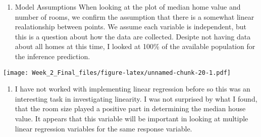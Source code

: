 \documentclass[]{article}
\newenvironment{Shaded}{\begin{snugshade}}{\end{snugshade}}
\newcommand{\KeywordTok}[1]{\textcolor[rgb]{0.13,0.29,0.53}{\textbf{#1}}}
\newcommand{\DataTypeTok}[1]{\textcolor[rgb]{0.13,0.29,0.53}{#1}}
\newcommand{\StringTok}[1]{\textcolor[rgb]{0.31,0.60,0.02}{#1}}
\newcommand{\OperatorTok}[1]{\textcolor[rgb]{0.81,0.36,0.00}{\textbf{#1}}}
\newcommand{\NormalTok}[1]{#1}
\providecommand{\tightlist}{%
  \setlength{\itemsep}{0pt}\setlength{\parskip}{0pt}}
\begin{document}
\begin{enumerate}
\def\labelenumi{\arabic{enumi})}
\setcounter{enumi}{8}
\tightlist
\item
  Model Assumptions When looking at the plot of median home value and
  number of rooms, we confirm the assumption that there is a somewhat
  linear realationship between points. We assume each variable is
  independent, but this is a question about how the data are collected.
  Desipte not having data about all homes at this time, I looked at
  100\% of the available population for the inference prediction.
\end{enumerate}

\begin{Shaded}
\end{Shaded}

\texttt{[image: Week\_2\_Final\_files/figure-latex/unnamed-chunk-20-1.pdf]}

\begin{enumerate}
\def\labelenumi{\arabic{enumi})}
\setcounter{enumi}{9}
\tightlist
\item
  I have not worked with implementing linear regression before so this
  was an interesting task in investigating linearity. I was not
  surprised by what I found, that the room size played a positive part
  in determining the median house value. It appears that this variable
  will be important in looking at multiple linear regression variables
  for the same response variable.
\end{enumerate}
\end{document}
